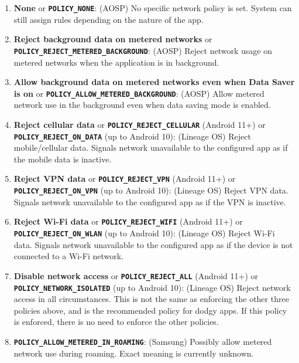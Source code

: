 \begin{enumerate}
    \item \textbf{None} or \textbf{\texttt{POLICY\_NONE}}: (AOSP) No specific network policy is set.
    System can still assign rules depending on the nature of the app.

    \item \textbf{Reject background data on metered networks} or \textbf{\texttt{POLICY\_REJECT\_METERED\_BACKGROUND}}: (AOSP) Reject network usage on metered networks when the application is in background.

    \item \textbf{Allow background data on metered networks even when Data Saver is on} or \textbf{\texttt{POLICY\_ALLOW\_METERED\_BACKGROUND}}: (AOSP) Allow metered network use in the background even when data saving mode is enabled.

    \item \textbf{Reject cellular data} or \textbf{\texttt{POLICY\_REJECT\_CELLULAR}} (Android 11+) or \textbf{\texttt{POLICY\_REJECT\_ON\_DATA}} (up to Android 10): (Lineage OS) Reject mobile/cellular data.
    Signals network unavailable to the configured app as if the mobile data is inactive.

    \item \textbf{Reject VPN data} or \textbf{\texttt{POLICY\_REJECT\_VPN}} (Android 11+) or \textbf{\texttt{POLICY\_REJECT\_ON\_VPN}} (up to Android 10): (Lineage OS) Reject VPN data.
    Signals network unavailable to the configured app as if the VPN is inactive.

    \item \textbf{Reject Wi-Fi data} or \textbf{\texttt{POLICY\_REJECT\_WIFI}} (Android 11+) or \textbf{\texttt{POLICY\_REJECT\_ON\_WLAN}} (up to Android 10): (Lineage OS) Reject Wi-Fi data.
    Signals network unavailable to the configured app as if the device is not connected to a Wi-Fi network.

    \item \textbf{Disable network access} or \textbf{\texttt{POLICY\_REJECT\_ALL}} (Android 11+) or \textbf{\texttt{POLICY\_NETWORK\_ISOLATED}} (up to Android 10): (Lineage OS) Reject network access in all circumstances.
    This is not the same as enforcing the other three policies above, and is the recommended policy for dodgy apps.
    If this policy is enforced, there is no need to enforce the other policies.

    \item \textbf{\texttt{POLICY\_ALLOW\_METERED\_IN\_ROAMING}}: (Samsung) Possibly allow metered network use during roaming.
    Exact meaning is currently unknown.


\end{enumerate}
